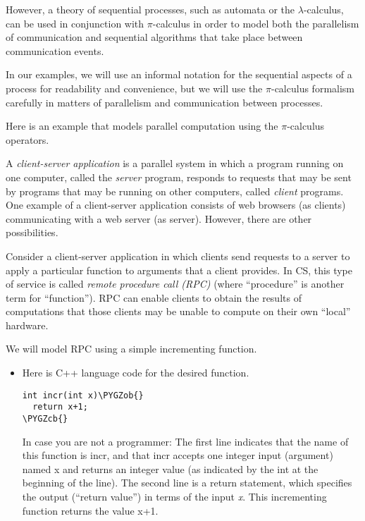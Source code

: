 \documentclass[letterpaper,10pt,openany,oneside]{sphinxmanual}
\def\PYGZob{\char`\{}
\def\PYGZcb{\char`\}}
\begin{document}
\begin{itemize}
However, a theory of sequential processes, such as automata or the $\lambda$-calculus, can be used in conjunction with $\pi$-calculus in order to model both the parallelism of communication and sequential algorithms that take place between communication events.

In our examples, we will use an informal notation for the sequential aspects of a process for readability and convenience, but we will use the $\pi$-calculus formalism carefully in matters of parallelism and communication between processes.

Here is an example that models parallel computation using the $\pi$-calculus operators.

A \emph{client-server application} is a parallel system in which a program running on one computer, called the \emph{server} program, responds to requests that may be sent by programs that may be running on other computers, called \emph{client} programs. One example of a client-server application consists of web browsers (as clients) communicating with a web server (as server). However, there are other possibilities.

Consider a client-server application in which clients send requests to a server to apply a particular function to arguments that a client provides. In CS, this type of service is called \emph{remote procedure call (RPC)} (where ``procedure'' is another term for ``function''). RPC can enable clients to obtain the results of computations that those clients may be unable to compute on their own ``local'' hardware.

We will model RPC using a simple incrementing function.
\begin{itemize}
\item {} 
Here is C++ language code for the desired function.

\begin{Verbatim}[commandchars=\\\{\}]
int incr(int x)\PYGZob{}
  return x+1;
\PYGZcb{}
\end{Verbatim}

In case you are not a programmer: The first line indicates that the name of this function is incr, and that incr accepts one integer input (argument) named x and returns an integer value (as indicated by the int at the beginning of the line). The second line is a return statement, which specifies the output (``return value'') in terms of the input \emph{x}. This incrementing function returns the value x+1.


\end{itemize}
\end{itemize}
\end{document}
